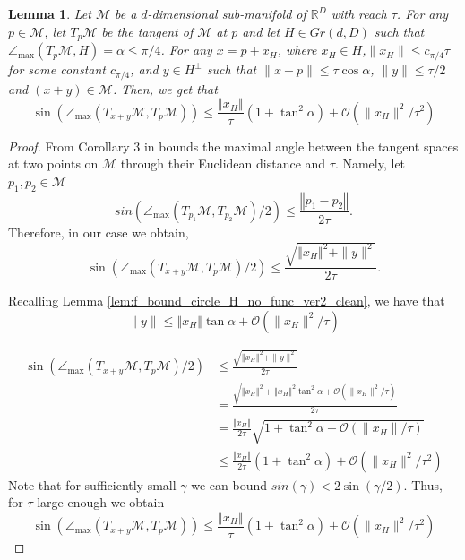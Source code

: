 \documentclass[12pt]{article}
\newtheorem{Lemma}[Theorem]{Lemma}
\theoremstyle{remark}
\newcommand{\RR}{\mathbb{R}}
\newcommand{\MM}{\mathcal{M}}
\newcommand{\OO}{\mathcal{O}}
\newcommand{\norm}[1]{\left\Vert #1 \right\Vert}
\newcommand{\maxangle}{\angle_{\max}}
\begin{document}
\begin{appendices}
\begin{Lemma}\label{lem:alpha-beta_x_no_func}
	Let $\MM$ be a $d$-dimensional sub-manifold of $\RR^D$ with reach $\tau$. For any $p \in \MM$, let $T_{p}\MM$ be the tangent of $\MM$ at $p$ and let $ H\in Gr(d, D) $ such that $ \maxangle(T_p\MM, H) = \alpha\leq \pi/4 $.
	For any $x = p + x_H$, where $x_H\in H$,$\|x_H\|\leq c_{\pi/4}\tau$ for some constant $c_{\pi/4}$, and $y\in H^\perp$  such that $\|x-p\|\leq \tau \cos \alpha$, $\|y\| \leq \tau/2$ and $(x + y)\in \MM$.
	Then, we get that
	\[
	\sin(\maxangle (T_{x+y}\MM, T_{p}\MM)) \leq \frac{\norm{x_H}}{\tau}(1 + \tan^2 \alpha)  +\OO(\|x_H\|^2/\tau^2)
	\]
\end{Lemma}
\begin{proof}
From  Corollary 3 in \cite{boissonnat2017reach} bounds the maximal angle between the tangent spaces at two points on $\MM$ through their Euclidean distance and $\tau$.
	Namely, let $p_1, p_2 \in \MM$
	\[
	sin(\maxangle(T_{p_1}\MM, T_{p_2}\MM)/2) \leq\frac{\norm{p_1 - p_2}}{2\tau}
	.\]
	Therefore, in our case we obtain,
	\begin{equation}\label{eq:sin_alpha_1}
	\sin(\maxangle (T_{x+y}\MM, T_{p}\MM)/2) \leq \frac{\sqrt{\norm{x_H}^2 + \|y\|^2}}{2\tau}
	.\end{equation}
		
	Recalling Lemma \ref{lem:f_bound_circle_H_no_func_ver2_clean}, we have that 
	\begin{equation*}
	\|y\| \leq \norm{x_H}\tan \alpha  +\OO(\|x_H\|^2/\tau)
	\end{equation*}
	
	\begin{align*}
	\sin(\maxangle (T_{x+y}\MM, T_{p}\MM)/2) &\leq \frac{\sqrt{\norm{x_H}^2 + \|y\|^2}}{2\tau}    \\
	&= \frac{\sqrt{\norm{x_H}^2 +  \norm{x_H}^2\tan^2 \alpha  +\OO(\|x_H\|^2/\tau)}}{2\tau}\\
	&=\frac{\norm{x_H}}{2\tau}\sqrt{1 + \tan^2 \alpha  +\OO(\|x_H\|/\tau)}\\
	&\leq\frac{\norm{x_H}}{2\tau}(1 + \tan^2 \alpha)  +\OO(\|x_H\|^2/\tau^2)
	\end{align*}
	Note that for sufficiently small $\gamma$ we can bound $sin(\gamma) < 2\sin(\gamma/2)$. 
    Thus, for $\tau$ large enough we obtain
	\[
	\sin(\maxangle (T_{x+y}\MM, T_{p}\MM)) \leq \frac{\norm{x_H}}{\tau}(1 + \tan^2 \alpha)  +\OO(\|x_H\|^2/\tau^2)
	\]
\end{proof}


\end{appendices}
\end{document}
